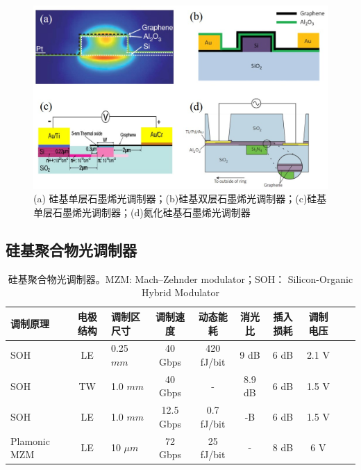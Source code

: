 \begin{figure}[htb]
	\centering
	\includegraphics[width=12cm]{./Pictures/fig_graphene_mod.jpg}
	\caption{ (a) 硅基单层石墨烯光调制器\cite{liu2011graphene}；(b)硅基双层石墨烯光调制器\cite{liu2012double}；(c)硅基单层石墨烯光调制器\cite{hu2014broadband}；(d)氮化硅基石墨烯光调制器\cite{phare2015graphene}}
	\label{fig_ge_mod}
\end{figure}

\subsection{硅基聚合物光调制器}

{
	\begin{table}[htb]
		\caption{硅基聚合物光调制器。MZM:  Mach–Zehnder modulator；SOH： Silicon-Organic Hybrid Modulator}
		\label{sil_graphene_mod}
		\centering
		\begin{tabular}[t]{p{1.5cm}cp{1.2cm}ccccccc}
			\hline
			调制原理 & 电极结构 & 调制区尺寸 & 调制速度 & 动态能耗 & 消光比 & 插入损耗 & 调制电压\\
			\hline
			SOH\cite{palmer2014high} & LE  & 0.25 $mm$ & 40 Gbps & 420 fJ/bit & 9 dB & 6 dB & 2.1 V\\
			SOH\cite{palmer2014high} & TW  & 1.0 $mm$ & 40 Gbps & - & 8.9 dB & 6 dB & 1.5 V\\	
			SOH\cite{koeber2015femtojoule} & LE  & 1.0 $mm$ & 12.5 Gbps & 0.7 fJ/bit & -B & 6 dB & 1.5 V\\			
			Plamonic MZM\cite{heni2015high} & LE  & 10 $\mu m$ & 72 Gbps & 25 fJ/bit & - & 8 dB & 6 V\\
			\hline
		\end{tabular}
	\end{table}
}

